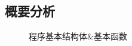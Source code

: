 \documentclass[UTF8,titlepage]{ctexart}
\numberwithin{figure}{section}
\begin{document}
\subsection{概要分析}
\begin{figure}[H]
\centering
 \caption{程序基本结构体\&基本函数}
 \label{}
\end{figure}
\end{document}
